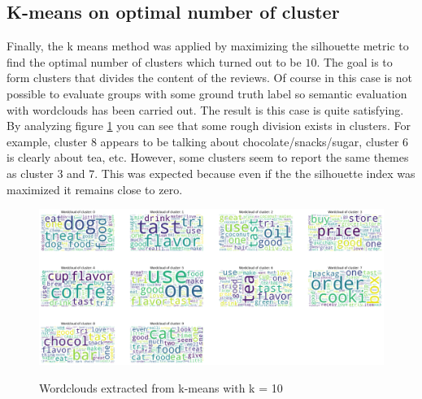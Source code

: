 \documentclass[11pt]{article}
\begin{document}
\subsection{K-means on optimal number of cluster}
Finally, the k means method was applied by maximizing the silhouette metric to find the optimal number of clusters which turned out to be $10$. The goal is to form clusters that divides the content of the reviews.
Of course in this case is not possible to evaluate groups with some ground truth label so semantic evaluation with wordclouds has been carried out. 
The result is this case is quite satisfying. By analyzing figure \ref{cluster_10_fig} you can see that some rough division exists in clusters. For example, cluster $8$ appears to be talking about chocolate/snacks/sugar, cluster $6$ is clearly about tea, etc. However, some clusters seem to report the same themes as cluster $3$ and $7$. This was expected because even if the the silhouette index was maximized it remains close to zero.

\begin{figure}[H]
    \hspace{-29.5pt}
    \includegraphics[scale = 0.35]{img/cluster_10.png}\\
    \caption{Wordclouds extracted from k-means with k = 10}
    \label{cluster_10_fig}
\end{figure}
\end{document}
